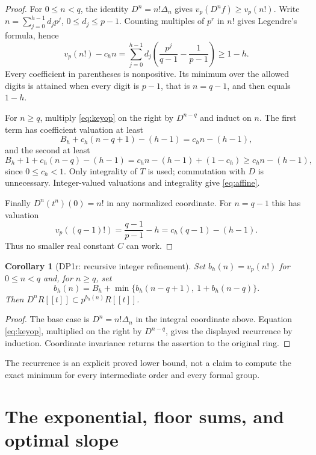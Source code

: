 \documentclass[11pt,a4paper]{article}
\newtheorem{corollary}[theorem]{Corollary}
\theoremstyle{definition}\newtheorem{remark}[theorem]{Remark}
\newcommand{\vp}{v_p}\newcommand{\dR}{\mathrm{dR}}\newcommand{\crys}{\mathrm{crys}}
\begin{document}
\begin{proof}
For $0\le n<q$, the identity $D^n=n!\Delta_n$ gives $\vp(D^nf)\ge\vp(n!)$. Write $n=\sum_{j=0}^{h-1}d_jp^j$, $0\le d_j\le p-1$. Counting multiples of $p^r$ in $n!$ gives Legendre's formula, hence
\[
 \vp(n!)-c_hn
 =\sum_{j=0}^{h-1}d_j\left(\frac{p^j}{q-1}-\frac1{p-1}\right)\ge1-h.
\]
Every coefficient in parentheses is nonpositive. Its minimum over the allowed digits is attained when every digit is $p-1$, that is $n=q-1$, and then equals $1-h$.

For $n\ge q$, multiply \eqref{eq:keyop} on the right by $D^{n-q}$ and induct on $n$. The first term has coefficient valuation at least
\[
 B_h+c_h(n-q+1)-(h-1)=c_hn-(h-1),
\]
and the second at least
\[
 B_h+1+c_h(n-q)-(h-1)
 =c_hn-(h-1)+(1-c_h)\ge c_hn-(h-1),
\]
since $0\le c_h<1$. Only integrality of $T$ is used; commutation with $D$ is unnecessary. Integer-valued valuations and integrality give \eqref{eq:affine}.

Finally $D^n(t^n)(0)=n!$ in any normalized coordinate. For $n=q-1$ this has valuation
\[
 \vp((q-1)!)=\frac{q-1}{p-1}-h=c_h(q-1)-(h-1).
\]
Thus no smaller real constant $C$ can work.
\end{proof}

\begin{corollary}[DP1r: recursive integer refinement]\label{DP1r}
Set $b_h(n)=\vp(n!)$ for $0\le n<q$ and, for $n\ge q$, set
\[
 b_h(n)=B_h+\min\{b_h(n-q+1),\ 1+b_h(n-q)\}.
\]
Then $D^nR[[t]]\subset p^{b_h(n)}R[[t]]$.
\end{corollary}
\begin{proof}
The base case is $D^n=n!\Delta_n$ in the integral coordinate above. Equation \eqref{eq:keyop}, multiplied on the right by $D^{n-q}$, gives the displayed recurrence by induction. Coordinate invariance returns the assertion to the original ring.
\end{proof}
The recurrence is an explicit proved lower bound, not a claim to compute the exact minimum for every intermediate order and every formal group.

\section{The exponential, floor sums, and optimal slope}
\end{document}
